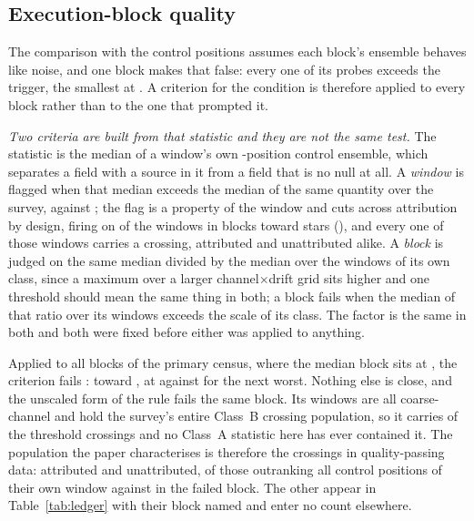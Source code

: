 \subsection{Execution-block quality}
\label{sec:blockquality}

The comparison with the control positions assumes each block's ensemble
behaves like noise, and one block makes that false: every one of its \NCtrl{}
probes exceeds the trigger, the smallest at \BqFailCtrlMin. A criterion for
the condition is therefore applied to every block rather than to the one that
prompted it.

\emph{Two criteria are built from that statistic and they are not the same
test.} The statistic is the median of a window's own \NCtrl-position control
ensemble, which separates a field with a source in it from a field that is no
null at all. A \emph{window} is flagged when that median exceeds \BqFactor{}
the median of the same quantity over the survey, \DqThresh{} against
\DqSurvMed; the flag is a property of the window and cuts across attribution
by design, firing on \DqNWin{} of the \NWindows{} windows in
\BkFlagNBlock{} blocks toward \DqNStar{} stars (\DqStars), and every one of
those windows carries a crossing, attributed and unattributed alike. A
\emph{block} is judged on the same median divided by the median over the
windows of its own class, since a maximum over a larger
channel$\times$drift grid sits higher and one threshold should mean the same
thing in both; a block fails when the median of that ratio over its windows
exceeds \BqFactor{} the scale of its class. The factor is the same in both
and both were fixed before either was applied to anything.

Applied to all \BqNBlocks{} blocks of the primary census, where the median
block sits at \BqQMed, the criterion fails \BqNFail: \BqFailBlock{} toward
\BqFailStar, at \BqFailQ{} against \BqNextQ{} for the next worst. Nothing
else is close, and the unscaled form of the rule fails the same
\BqRawNFail{} block. Its \BqFailNWin{} windows are all coarse-channel and
hold the survey's entire Class~B crossing population, so it carries
\EvNCrossFlag{} of the \EvNCrossRaw{} threshold crossings and no Class~A
statistic here has ever contained it. The population the paper characterises
is therefore the \EvNCrossQp{} crossings in quality-passing data:
\EvNAttrQp{} attributed and \EvNUnattrQp{} unattributed, \EvNRankQp{} of
those outranking all \NCtrl{} control positions of their own window against
\EvNRankFlag{} in the failed block. The other \EvNCrossFlag{} appear in
Table~\ref{tab:ledger} with their block named and enter no count elsewhere.

